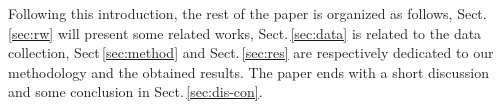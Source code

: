 Following this introduction, the rest of the paper is organized as follows, Sect.\,\ref{sec:rw} will present some related works, Sect.\,\ref{sec:data} is related to the data collection, Sect\,\ref{sec:method} and Sect.\,\ref{sec:res} are respectively dedicated to our methodology and the obtained results.
The paper ends with a short discussion and some conclusion in Sect.\,\ref{sec:dis-con}.




